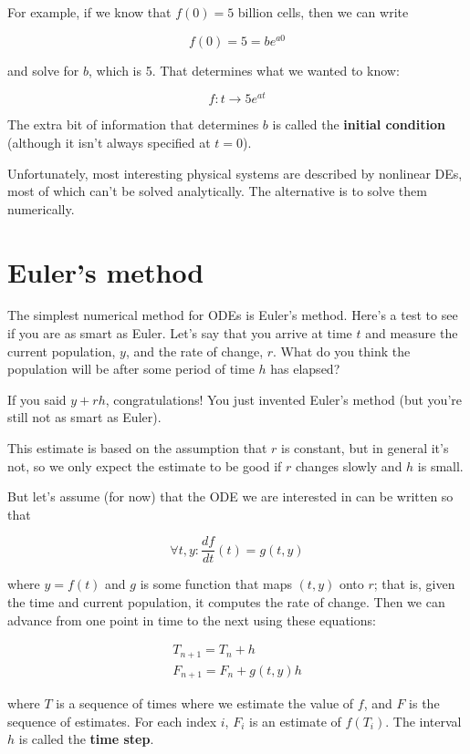 \documentclass{book}
\begin{document}
For example, if we know that $f(0) = 5$ billion cells, then we
can write

\[ f(0) = 5 = b e^{a 0} \]

and solve for $b$, which is 5. That determines what we wanted
to know:

\[ f : t \to 5 e^{at} \]

The extra bit of information that determines $b$ is called
the {\bf initial condition} (although it isn't always specified
at $t=0$).

Unfortunately, most interesting physical systems are described by
nonlinear DEs, most of which can't be solved analytically. The
alternative is to solve them numerically.


\section{Euler's method}

The simplest numerical method for ODEs is Euler's method. Here's a
test to see if you are as smart as Euler. Let's say that you
arrive at time $t$ and measure the current population, $y$, and
the rate of change, $r$. What do you think the population will
be after some period of time $h$ has elapsed?

If you said $y + r h$, congratulations! You just invented
Euler's method (but you're still not as smart as Euler).

This estimate is based on the assumption that $r$ is constant, but
in general it's not, so we only expect the estimate to be good if
$r$ changes slowly and $h$ is small.

But let's assume (for now) that the ODE we are interested in can
be written so that

\[ \forall t,y: \frac{df}{dt}(t) = g(t, y) \]

where $y=f(t)$ and $g$ is some function that maps $(t, y)$ onto $r$;
that is, given the time and current population, it computes the rate
of change. Then we can advance from one point in time to the
next using these equations:

\begin{eqnarray}
\label{euler1}
T_{n+1} = T_n + h       \\
\label{euler2}
F_{n+1} = F_n + g(t,y) h
\end{eqnarray}

where $T$ is a sequence of times where we estimate the value
of $f$, and $F$ is the sequence of estimates. For each
index $i$, $F_i$ is an estimate of $f(T_i)$.
The interval $h$ is called the {\bf time step}.
\end{document}
